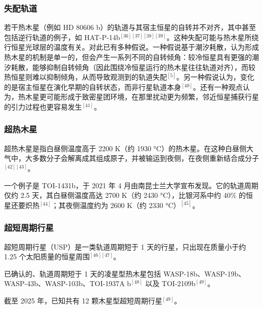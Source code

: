 \subsubsection{失配轨道}
若干热木星（例如 HD 80606 b）的轨道与其宿主恒星的自转并不对齐，其中甚至包括逆行轨道的例子，如 HAT-P-14b$^{[36][37][38][39]}$。这种失配可能与热木星所绕行恒星光球层的温度有关。对此已有多种假说。一种假说基于潮汐耗散，认为形成热木星的机制是单一的，但会产生一系列不同的自转倾角：较冷恒星具有更强的潮汐耗散，能够抑制自转倾角（因此围绕冷恒星运行的热木星往往轨道对齐），而较热恒星则难以抑制倾角，从而导致观测到的轨道失配$^{[5]}$。另一种假说认为，变化的是宿主恒星在演化早期的自转状态，而非行星轨道本身$^{[40]}$。还有一种观点认为，热木星更可能形成于致密星团环境，在那里扰动更为频繁，邻近恒星捕获行星的引力过程也更容易发生$^{[41]}$。
\subsubsection{超热木星}
超热木星是指白昼侧温度高于 2200 K（约 1930 °C）的热木星。在这种白昼侧大气中，大多数分子会解离成其组成原子，并被输运到夜侧，在夜侧重新结合成分子$^{[42][43]}$。

一个例子是 TOI-1431b，于 2021 年 4 月由南昆士兰大学宣布发现。它的轨道周期仅约 2.5 天，其白昼侧温度高达 2700 K（约 2430 °C），比银河系中约 40\% 的恒星还要炽热$^{[44]}$；其夜侧温度约为 2600 K（约 2330 °C）$^{[45]}$。
\subsubsection{超短周期行星}
超短周期行星（USP）是一类轨道周期短于 1 天的行星，只出现在质量小于约 1.25 个太阳质量的恒星周围$^{[46][47]}$。

已确认的、轨道周期短于 1 天的凌星型热木星包括 WASP-18b、WASP-19b、WASP-43b、WASP-103b、TOI-1937A b$^{[48]}$ 以及 TOI-2109b$^{[49]}$。

截至 2025 年，已知共有 12 颗木星型超短周期行星$^{[49]}$。
